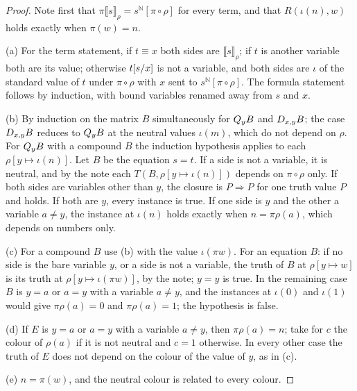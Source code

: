 \begin{proof}
Note first that $\pi\llbracket s\rrbracket_\rho=s^{\mathbb N}[\pi\circ\rho]$
for every term, and that $R(\iota(n),w)$ holds exactly when $\pi(w)=n$.

(a) For the term statement, if $t\equiv x$ both sides are
$\llbracket s\rrbracket_\rho$; if $t$ is another variable both are its value;
otherwise $t[s/x]$ is not a variable, and both sides are $\iota$ of the
standard value of $t$ under $\pi\circ\rho$ with $x$ sent to
$s^{\mathbb N}[\pi\circ\rho]$. The formula statement follows by induction,
with bound variables renamed away from $s$ and $x$.

(b) By induction on the matrix $B$ simultaneously for $Q_{y}B$ and
$D_{x,y}B$; the case $D_{x,y}B$ reduces to $Q_{y}B$ at the neutral values
$\iota(m)$, which do not depend on $\rho$. For $Q_{y}B$ with a compound $B$
the induction hypothesis applies to each $\rho[y\mapsto\iota(n)]$. Let $B$ be
the equation $s=t$. If a side is not a variable, it is neutral, and by the
note each $T(B,\rho[y\mapsto\iota(n)])$ depends on $\pi\circ\rho$ only. If
both sides are variables other than $y$, the closure is $P\Rightarrow P$ for
one truth value $P$ and holds. If both are $y$, every instance is true. If
one side is $y$ and the other a variable $a\neq y$, the instance at
$\iota(n)$ holds exactly when $n=\pi\rho(a)$, which depends on numbers only.

(c) For a compound $B$ use (b) with the value $\iota(\pi w)$. For an equation
$B$: if no side is the bare variable $y$, or a side is not a variable, the
truth of $B$ at $\rho[y\mapsto w]$ is its truth at
$\rho[y\mapsto\iota(\pi w)]$, by the note; $y=y$ is true. In the remaining
case $B$ is $y=a$ or $a=y$ with a variable $a\neq y$, and the instances at
$\iota(0)$ and $\iota(1)$ would give $\pi\rho(a)=0$ and $\pi\rho(a)=1$; the
hypothesis is false.

(d) If $E$ is $y=a$ or $a=y$ with a variable $a\neq y$, then
$\pi\rho(a)=n$; take for $c$ the colour of $\rho(a)$ if it is not neutral and
$c=1$ otherwise. In every other case the truth of $E$ does not depend on the
colour of the value of $y$, as in (c).

(e) $n=\pi(w)$, and the neutral colour is related to every colour.
\end{proof}

